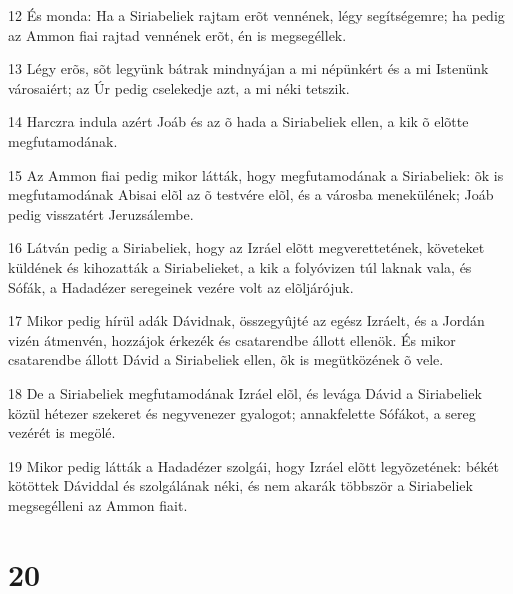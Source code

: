 \par 12 És monda: Ha a Siriabeliek rajtam erõt vennének, légy segítségemre; ha pedig az Ammon fiai rajtad vennének erõt, én is megsegéllek.
\par 13 Légy erõs, sõt legyünk bátrak mindnyájan a mi népünkért és a mi Istenünk  városaiért; az Úr pedig cselekedje azt, a mi néki tetszik.
\par 14 Harczra indula azért Joáb és az õ hada a Siriabeliek ellen, a kik õ elõtte megfutamodának.
\par 15 Az Ammon fiai pedig mikor látták, hogy megfutamodának a Siriabeliek: õk is megfutamodának Abisai elõl az õ testvére elõl, és a városba menekülének; Joáb pedig visszatért Jeruzsálembe.
\par 16 Látván pedig a Siriabeliek, hogy az Izráel elõtt megverettetének, követeket küldének és kihozatták a Siriabelieket, a kik a folyóvizen túl laknak vala, és Sófák, a Hadadézer seregeinek vezére volt az elõljárójuk.
\par 17 Mikor pedig hírül adák Dávidnak, összegyûjté az egész Izráelt, és a Jordán vizén átmenvén, hozzájok érkezék és csatarendbe állott ellenök. És mikor csatarendbe állott Dávid a Siriabeliek ellen, õk is megütközének õ vele.
\par 18 De a Siriabeliek megfutamodának Izráel elõl, és levága Dávid a Siriabeliek közül hétezer szekeret és negyvenezer gyalogot; annakfelette Sófákot,  a sereg vezérét is megölé.
\par 19 Mikor pedig látták a Hadadézer szolgái, hogy Izráel elõtt legyõzetének: békét kötöttek Dáviddal és szolgálának néki, és nem akarák többször a Siriabeliek megsegélleni az Ammon fiait.

\chapter{20}

